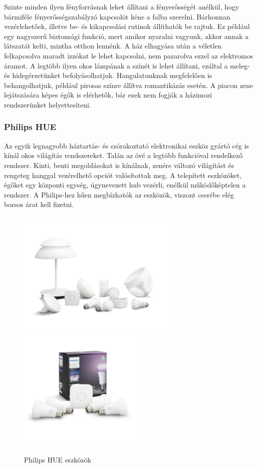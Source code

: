 \documentclass[../main.tex]{subfiles}
\begin{document}
        Szinte minden ilyen fényforrásnak lehet állítani a fényerősségét anélkül, hogy bármiféle fényerősségszabályzó kapcsolót kéne a falba szerelni. Bárhonnan vezérlehetőek, illetve be- és kikapcsolási rutinok állíthatók be rajtuk. Ez például egy nagyszerű biztonsági funkció, mert amikor nyaralni vagyunk, akkor annak a látszatát kelti, mintha otthon lennénk. A ház elhagyása után a véletlen felkapcsolva maradt izzókat le lehet kapcsolni, nem pazarolva ezzel az elektromos áramot. A legtöbb ilyen okos lámpának a színét is lehet állítani, ezáltal a meleg- és hidegérzetünket befolyásolhatjuk. Hangulatunknak megfelelően is behangolhatjuk, például pirosas színre állítva romantikázás esetén. A piacon zene lejátszására képes égők is elérhetők, bár ezek nem fogják a házimozi rendszerünket helyettesíteni.\cite{led_lighting4}\cite{led_lighting5}
            
        \subsubsection{Philips HUE}
            Az egyik legnagyobb háztartás- és  szórakoztató elektronikai eszköz gyártó cég is kínál okos világítás rendszereket. Talán az övé a legtöbb funkcióval rendelkező rendszer. Kinti, benti megoldásokat is kínálnak, zenére változó világítást és rengeteg hanggal vezérelhető opciót valósítottak meg. A telepített eszközöket, égőket egy központi egység, úgynevezett hub vezérli, enélkül működőképtelen a rendszer. A Philips-hez hűen megbízhatók az eszközök, viszont cserébe elég borsos árat kell fizetni.\cite{led_lighting6}
            
            \begin{figure}[h!]
                \centering
                    \includegraphics[height=6cm]{irodalom_res/philips_hue_termekek}
                    \includegraphics[height=6cm]{irodalom_res/philips_hue_termekek_2}
                \caption{Philips HUE eszközök\cite{led_lighting7}\cite{led_lighting8}}
                \label{fig:philips_hue}
             \end{figure}
            
\end{document}
